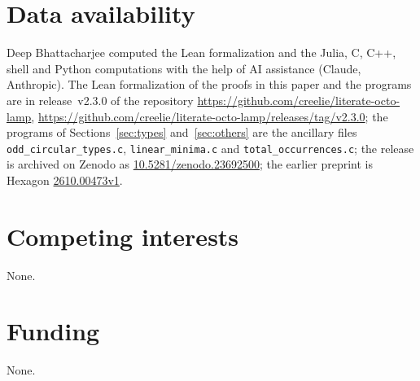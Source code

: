\documentclass[11pt,reqno]{amsart}
\newcommand{\releaseURL}{https://github.com/creelie/literate-octo-lamp/releases/tag/v2.3.0}
\theoremstyle{definition}
\begin{document}
\section*{Data availability}
\begingroup\raggedright
Deep Bhattacharjee computed the Lean formalization and the Julia, C, C++, shell and Python computations with the help of AI assistance (Claude, Anthropic). The Lean formalization of the proofs in this paper and the programs are in release~v2.3.0 of the repository \url{https://github.com/creelie/literate-octo-lamp}, \url{\releaseURL}; the programs of Sections~\ref{sec:types} and~\ref{sec:others} are the ancillary files \texttt{odd\_circular\_types.c}, \texttt{linear\_minima.c} and \texttt{total\_occurrences.c}; the release is archived on Zenodo as \href{https://doi.org/10.5281/zenodo.23692500}{10.5281/zenodo.23692500}; the earlier preprint is Hexagon \href{https://hexagonmath.org/2610.00473v1}{2610.00473v1}.\par
\endgroup

\section*{Competing interests}
None.

\section*{Funding}
None.
\end{document}
